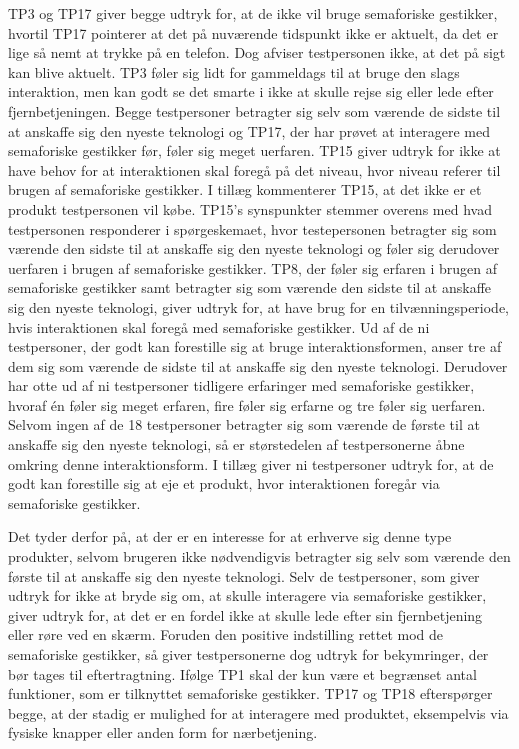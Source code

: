 TP3 og TP17 giver begge udtryk for, at de ikke vil bruge semaforiske gestikker, hvortil TP17 pointerer at det på nuværende tidspunkt ikke er aktuelt, da det er lige så nemt at trykke på en telefon. Dog afviser testpersonen ikke, at det på sigt kan blive aktuelt. TP3 føler sig lidt for gammeldags til at bruge den slags interaktion, men kan godt se det smarte i ikke at skulle rejse sig eller lede efter fjernbetjeningen. Begge testpersoner betragter sig selv som værende de sidste til at anskaffe sig den nyeste teknologi og TP17, der har prøvet at interagere med semaforiske gestikker før, føler sig meget uerfaren. TP15 giver udtryk for ikke at have behov for at interaktionen skal foregå på det niveau, hvor niveau referer til brugen af semaforiske gestikker. I tillæg kommenterer TP15, at det ikke er et produkt testpersonen vil købe. TP15's synspunkter stemmer overens med hvad testpersonen responderer i spørgeskemaet, hvor testepersonen betragter sig som værende den sidste til at anskaffe sig den nyeste teknologi og føler sig derudover uerfaren i brugen af semaforiske gestikker. TP8, der føler sig erfaren i brugen af semaforiske gestikker samt betragter sig som værende den sidste til at anskaffe sig den nyeste teknologi, giver udtryk for, at have brug for en tilvænningsperiode, hvis interaktionen skal foregå med semaforiske gestikker.\blankline
%
Ud af de ni testpersoner, der godt kan forestille sig at bruge interaktionsformen, anser tre af dem sig som værende de sidste til at anskaffe sig den nyeste teknologi. Derudover har otte ud af ni testpersoner tidligere erfaringer med semaforiske gestikker, hvoraf én føler sig meget erfaren, fire føler sig erfarne og tre føler sig uerfaren. Selvom ingen af de 18 testpersoner betragter sig som værende de første til at anskaffe sig den nyeste teknologi, så er størstedelen af testpersonerne åbne omkring denne interaktionsform. I tillæg giver ni testpersoner udtryk for, at de godt kan forestille sig at eje et produkt, hvor interaktionen foregår via semaforiske gestikker.

Det tyder derfor på, at der er en interesse for at erhverve sig denne type produkter, selvom brugeren ikke nødvendigvis betragter sig selv som værende den første til at anskaffe sig den nyeste teknologi. Selv de testpersoner, som giver udtryk for ikke at bryde sig om, at skulle interagere via semaforiske gestikker, giver udtryk for, at det er en fordel ikke at skulle lede efter sin fjernbetjening eller røre ved en skærm.\blankline 
%
Foruden den positive indstilling rettet mod de semaforiske gestikker, så giver testpersonerne dog udtryk for bekymringer, der bør tages til eftertragtning. Ifølge TP1 skal der kun være et begrænset antal funktioner, som er tilknyttet semaforiske gestikker. TP17 og TP18 efterspørger begge, at der stadig er mulighed for at interagere med produktet, eksempelvis via fysiske knapper eller anden form for nærbetjening.  

